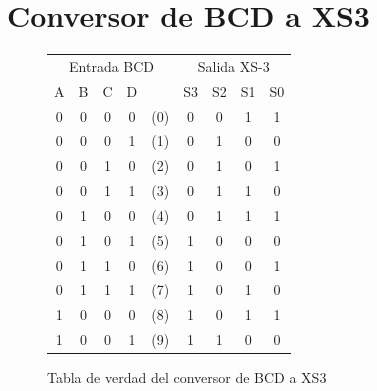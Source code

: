 \documentclass[]{informeutn}
\begin{document}
  \maketitle

  \tableofcontents
  \setcounter{page}{1}
  \thispagestyle{plain}


  \chapter{Conversor de BCD a XS3}
    \begin{figure}[!ht]
      \centering
      \begin{tabular}{|c|c|c|c|c||c|c|c|c|}
      \hline
      \multicolumn{5}{|c||}{Entrada BCD} & \multicolumn{4}{c|}{Salida XS-3} \\
      A & B & C & D & & S3 & S2 & S1 & S0 \\
      \hline
      0 & 0 & 0 & 0 & (0) & 0 & 0 & 1 & 1 \\
      0 & 0 & 0 & 1 & (1) & 0 & 1 & 0 & 0 \\
      0 & 0 & 1 & 0 & (2) & 0 & 1 & 0 & 1 \\
      0 & 0 & 1 & 1 & (3) & 0 & 1 & 1 & 0 \\
      0 & 1 & 0 & 0 & (4) & 0 & 1 & 1 & 1 \\
      0 & 1 & 0 & 1 & (5) & 1 & 0 & 0 & 0 \\
      0 & 1 & 1 & 0 & (6) & 1 & 0 & 0 & 1 \\
      0 & 1 & 1 & 1 & (7) & 1 & 0 & 1 & 0 \\
      1 & 0 & 0 & 0 & (8) & 1 & 0 & 1 & 1 \\
      1 & 0 & 0 & 1 & (9) & 1 & 1 & 0 & 0 \\
      \hline
      \end{tabular}
      \caption{Tabla de verdad del conversor de BCD a XS3}
    \end{figure}
\end{document}
